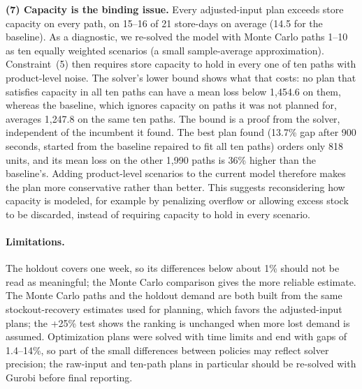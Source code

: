 \textbf{(7) Capacity is the binding issue.} Every adjusted-input plan exceeds store
capacity on every path, on 15--16 of 21 store-days on average (14.5 for the
baseline). As a diagnostic, we
re-solved the model with Monte Carlo paths 1--10 as ten equally weighted
scenarios (a small sample-average approximation). Constraint~(5) then requires
store capacity to hold in every one of ten paths with product-level noise. The
solver's lower bound shows what that costs: no plan that satisfies capacity in all
ten paths can have a mean loss below 1{,}454.6 on them, whereas the baseline,
which ignores capacity on paths it was not planned for, averages 1{,}247.8 on the
same ten paths. The bound is a proof from the solver, independent of the
incumbent it found. The best plan found (13.7\% gap after 900 seconds, started
from the baseline repaired to fit all ten paths) orders only 818 units, and its
mean loss on the other 1{,}990 paths is 36\% higher than the baseline's. Adding
product-level scenarios to the current model therefore makes the plan more
conservative rather than better. This suggests reconsidering how capacity is
modeled, for example by penalizing overflow or allowing excess stock to be
discarded, instead of requiring capacity to hold in every scenario.

\paragraph{Limitations.}
The holdout covers one week, so its differences below about 1\% should not be
read as meaningful; the Monte Carlo comparison gives the more reliable estimate.
The Monte Carlo paths and the holdout demand are both built from the same
stockout-recovery estimates used for planning, which favors the adjusted-input
plans; the +25\% test shows the ranking is unchanged when more lost demand is
assumed. Optimization plans were solved with time limits and end with gaps of
1.4--14\%, so part of the small differences between policies may reflect solver
precision; the raw-input and ten-path plans in particular should be re-solved
with Gurobi before final reporting.

